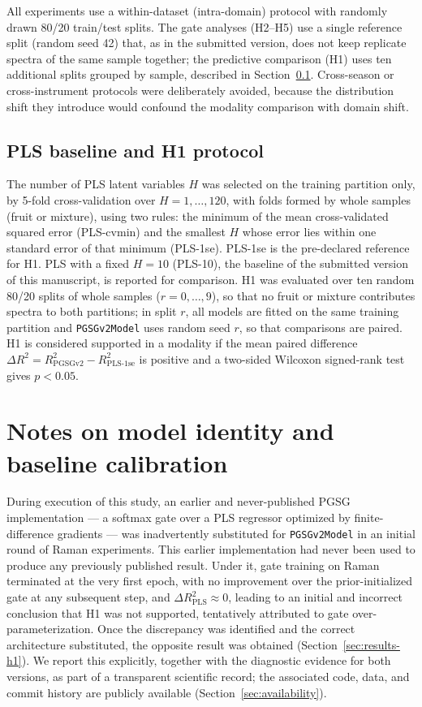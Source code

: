 \documentclass[preprint,12pt]{elsarticle}
\begin{document}
All experiments use a within-dataset (intra-domain) protocol with randomly drawn 80/20 train/test splits. The gate analyses (H2--H5) use a single reference split (random seed 42) that, as in the submitted version, does not keep replicate spectra of the same sample together; the predictive comparison (H1) uses ten additional splits grouped by sample, described in Section~\ref{sec:pls}. Cross-season or cross-instrument protocols were deliberately avoided, because the distribution shift they introduce would confound the modality comparison with domain shift.


\subsection{PLS baseline and H1 protocol}
\label{sec:pls}

The number of PLS latent variables $H$ was selected on the training partition only, by 5-fold cross-validation over $H=1,\dots,120$, with folds formed by whole samples (fruit or mixture), using two rules: the minimum of the mean cross-validated squared error (PLS-cvmin) and the smallest $H$ whose error lies within one standard error of that minimum (PLS-1se). PLS-1se is the pre-declared reference for H1. PLS with a fixed $H=10$ (PLS-10), the baseline of the submitted version of this manuscript, is reported for comparison. H1 was evaluated over ten random 80/20 splits of whole samples ($r=0,\dots,9$), so that no fruit or mixture contributes spectra to both partitions; in split $r$, all models are fitted on the same training partition and \texttt{PGSGv2Model} uses random seed $r$, so that comparisons are paired. H1 is considered supported in a modality if the mean paired difference $\Delta R^{2}=R^{2}_{\mathrm{PGSGv2}}-R^{2}_{\mathrm{PLS\text{-}1se}}$ is positive and a two-sided Wilcoxon signed-rank test gives $p<0.05$.

\section{Notes on model identity and baseline calibration}
\label{sec:model-identity}

During execution of this study, an earlier and never-published PGSG implementation --- a softmax gate over a PLS regressor optimized by finite-difference gradients --- was inadvertently substituted for \texttt{PGSGv2Model} in an initial round of Raman experiments. This earlier implementation had never been used to produce any previously published result. Under it, gate training on Raman terminated at the very first epoch, with no improvement over the prior-initialized gate at any subsequent step, and $\Delta R^{2}_{\mathrm{PLS}}\approx0$, leading to an initial and incorrect conclusion that H1 was not supported, tentatively attributed to gate over-parameterization. Once the discrepancy was identified and the correct architecture substituted, the opposite result was obtained (Section~\ref{sec:results-h1}). We report this explicitly, together with the diagnostic evidence for both versions, as part of a transparent scientific record; the associated code, data, and commit history are publicly available (Section~\ref{sec:availability}).
\end{document}
